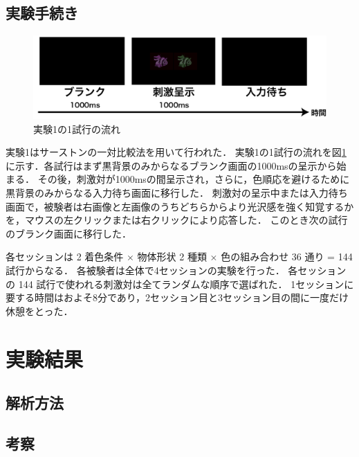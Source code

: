    \subsection{実験手続き}

        \begin{figure}[h]
            \centering
            \includegraphics[width=14.0cm]{./img/ex1_procedure.png}
            \caption{実験1の1試行の流れ}
            \label{ex1_procedure}
        \end{figure}

        実験1はサーストンの一対比較法を用いて行われた．
        実験1の1試行の流れを図\ref{ex1_procedure}に示す．各試行はまず黒背景のみからなるブランク画面の1000msの呈示から始まる．
        その後，刺激対が1000msの間呈示され，さらに，色順応を避けるために黒背景のみからなる入力待ち画面に移行した．
        刺激対の呈示中または入力待ち画面で，被験者は右画像と左画像のうちどちらからより光沢感を強く知覚するかを，マウスの左クリックまたは右クリックにより応答した．
        このとき次の試行のブランク画面に移行した．

        各セッションは 2 着色条件 $\times$ 物体形状 2 種類 $\times$ 色の組み合わせ 36 通り = 144 試行からなる．
        各被験者は全体で4セッションの実験を行った．
        各セッションの 144 試行で使われる刺激対は全てランダムな順序で選ばれた．
        1セッションに要する時間はおよそ8分であり，2セッション目と3セッション目の間に一度だけ休憩をとった．



\section{実験結果}
    \subsection{解析方法}

    \subsection{考察}
        
